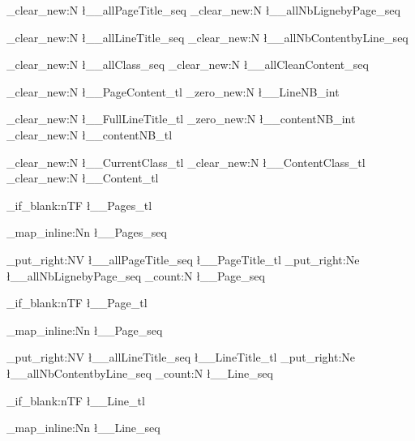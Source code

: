 \ExplSyntaxOn
\NewDocumentCommand{}
{    
    \seq_clear_new:N \l__allPageTitle_seq
    \seq_clear_new:N \l__allNbLignebyPage_seq
    
    \seq_clear_new:N \l__allLineTitle_seq
    \seq_clear_new:N \l__allNbContentbyLine_seq
    
    \seq_clear_new:N \l__allClass_seq
    \seq_clear_new:N \l__allCleanContent_seq

    \tl_clear_new:N \l__PageContent_tl
    \int_zero_new:N \l__LineNB_int

    \tl_clear_new:N \l__FullLineTitle_tl
    \int_zero_new:N \l__contentNB_int
    \tl_clear_new:N \l__contentNB_tl

    \tl_clear_new:N \l__CurrentClass_tl
    \tl_clear_new:N \l__ContentClass_tl
    \tl_clear_new:N \l__Content_tl
    
    
    

    \tl_if_blank:nTF {\l__Pages_tl}
        {}%
        {%
            \seq_map_inline:Nn \l__Pages_seq 
            {
            
            \seq_put_right:NV \l__allPageTitle_seq \l__PageTitle_tl
            \seq_put_right:Ne \l__allNbLignebyPage_seq {\seq_count:N \l__Page_seq}
            

            \tl_if_blank:nTF {\l__Page_tl}
                {}%
                {%
                \seq_map_inline:Nn \l__Page_seq
                    {                   
                    
                    \seq_put_right:NV \l__allLineTitle_seq \l__LineTitle_tl
                    \seq_put_right:Ne \l__allNbContentbyLine_seq {\seq_count:N \l__Line_seq}
                    
                    \tl_if_blank:nTF {\l__Line_tl}
                        {}%
                        {%
                        \seq_map_inline:Nn \l__Line_seq
                            {                   
                                
}}}}}}}
